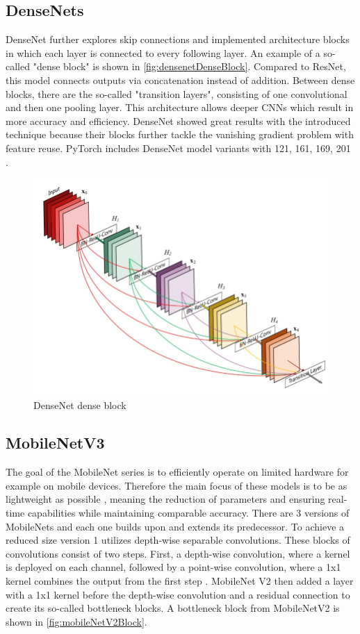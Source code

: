 \subsection{DenseNets}

DenseNet \cite{DenseNets} further explores skip connections and implemented architecture blocks in which each layer is connected to every following layer.
An example of a so-called "dense block" is shown in \autoref{fig:densenetDenseBlock}.
Compared to ResNet, this model connects outputs via concatenation instead of addition.
Between dense blocks, there are the so-called "transition layers", consisting of one convolutional and then one pooling layer.
This architecture allows deeper \ac{CNN}s which result in more accuracy and efficiency.
DenseNet showed great results with the introduced technique because their blocks further tackle the vanishing gradient problem with feature reuse.
PyTorch includes DenseNet model variants with 121, 161, 169, 201 \cite{pytorchdensenet}.

\begin{figure}[H]
    \centering
    \includegraphics[width=0.5\linewidth]{PICs/backbones/densenet_denseBlock.jpg}
    \caption{DenseNet dense block \cite{DenseNets}}
    \label{fig:densenetDenseBlock}
\end{figure}

\subsection{MobileNetV3}

The goal of the MobileNet series \cite{MobileNetV3} is to efficiently operate on limited hardware for example on mobile devices.
Therefore the main focus of these models is to be as lightweight as possible \cite{networkArchitectureSurvey}, meaning the reduction of parameters and ensuring real-time capabilities while maintaining comparable accuracy.
There are 3 versions of MobileNets and each one builds upon and extends its predecessor.
To achieve a reduced size version 1 utilizes depth-wise separable convolutions.
These blocks of convolutions consist of two steps. First, a depth-wise convolution, where a kernel is deployed on each channel, followed by a point-wise convolution, where a 1x1 kernel combines the output from the first step \cite{networkArchitectureSurvey}.
MobileNet V2 then added a layer with a 1x1 kernel before the depth-wise convolution and a residual connection to create its so-called bottleneck blocks.
A bottleneck block from MobileNetV2 is shown in \autoref{fig:mobileNetV2Block}.

